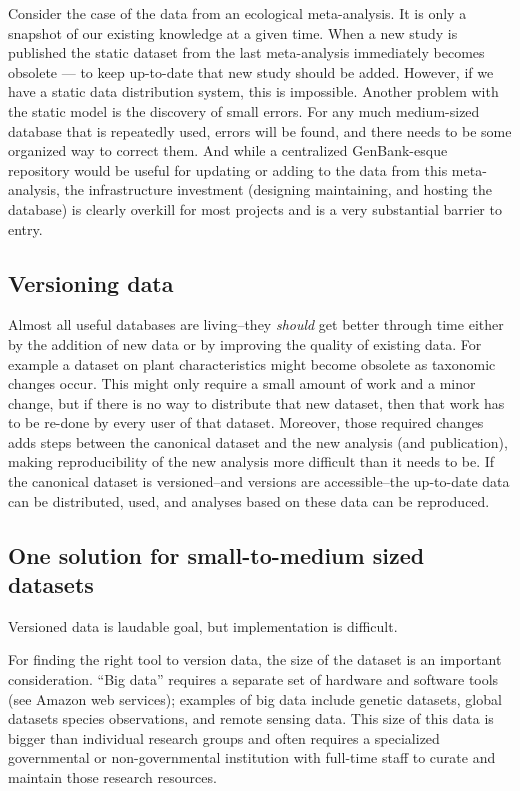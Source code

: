 \documentclass[a4paper,11pt]{article}
\begin{document}
Consider the case of the data from an ecological meta-analysis. It is only a snapshot of our existing knowledge at a given time. When a new study is published the static dataset from the last meta-analysis immediately becomes obsolete --- to keep up-to-date that new study should be added. However, if we have a static data distribution system, this is impossible. Another problem with the static model is the discovery of small errors. For any much medium-sized database that is repeatedly used, errors will be found, and there needs to be some organized way to correct them. And while a centralized GenBank-esque repository would be useful for updating or adding to the data from this meta-analysis, the infrastructure investment (designing maintaining, and hosting the database) is clearly overkill for most projects and is a very substantial barrier to entry.

\subsection{Versioning data}

Almost all useful databases are living--they \emph{should} get better
through time either by the addition of new data or by improving the
quality of existing data. For example a dataset on plant characteristics
might become obsolete as taxonomic changes occur. This might only
require a small amount of work and a minor change, but if there is no
way to distribute that new dataset, then that work has to be re-done by
every user of that dataset. Moreover, those required changes adds steps
between the canonical dataset and the new analysis (and publication),
making reproducibility of the new analysis more difficult than it needs
to be. If the canonical dataset is versioned--and versions are
accessible--the up-to-date data can be distributed, used, and analyses
based on these data can be reproduced.

\subsection{One solution for small-to-medium sized
datasets}

Versioned data is laudable goal, but implementation is difficult.

For finding the right tool to version data, the size of the dataset is
an important consideration. ``Big data'' requires a separate set of
hardware and software tools (see Amazon web services); examples of big
data include genetic datasets, global datasets species observations, and
remote sensing data. This size of this data is bigger than individual
research groups and often requires a specialized governmental or
non-governmental institution with full-time staff to curate and maintain
those research resources.
\end{document}
